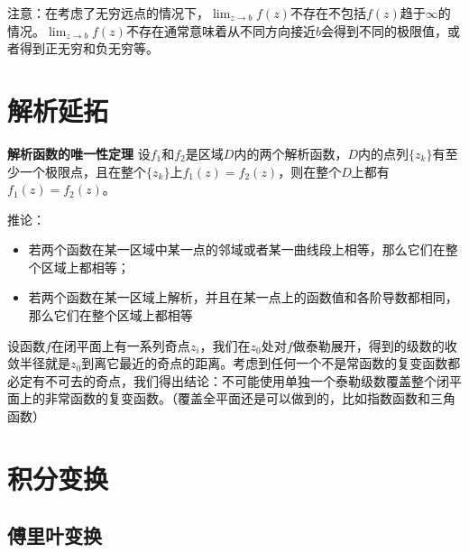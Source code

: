 \documentclass[UTF8]{ctexart}
\begin{document}
注意：在考虑了无穷远点的情况下，$\lim_{z\rightarrow b} f(z)$不存在不包括$f(z)$趋于$\infty$的情况。$\lim_{z\rightarrow b} f(z)$不存在通常意味着从不同方向接近$b$会得到不同的极限值，或者得到正无穷和负无穷等。

\hypertarget{ux89e3ux6790ux5ef6ux62d3}{%
\section{解析延拓}\label{ux89e3ux6790ux5ef6ux62d3}}

\textbf{解析函数的唯一性定理}
设$f_1$和$f_2$是区域$D$内的两个解析函数，$D$内的点列$\{z_k\}$有至少一个极限点，且在整个$\{z_k\}$上$f_1(z)=f_2(z)$，则在整个$D$上都有$f_1(z)=f_2(z)$。

推论： 
\begin{itemize}
    \item 若两个函数在某一区域中某一点的邻域或者某一曲线段上相等，那么它们在整个区域上都相等；
    \item 若两个函数在某一区域上解析，并且在某一点上的函数值和各阶导数都相同，那么它们在整个区域上都相等
\end{itemize}

设函数$f$在闭平面上有一系列奇点$z_i$，我们在$z_0$处对$f$做泰勒展开，得到的级数的收敛半径就是$z_0$到离它最近的奇点的距离。考虑到任何一个不是常函数的复变函数都必定有不可去的奇点，我们得出结论：不可能使用单独一个泰勒级数覆盖整个闭平面上的非常函数的复变函数。（覆盖全平面还是可以做到的，比如指数函数和三角函数）

\hypertarget{ux79efux5206ux53d8ux6362}{%
\section{积分变换}\label{ux79efux5206ux53d8ux6362}}

\hypertarget{ux5085ux91ccux53f6ux53d8ux6362}{%
\subsection{傅里叶变换}\label{ux5085ux91ccux53f6ux53d8ux6362}}
\end{document}
